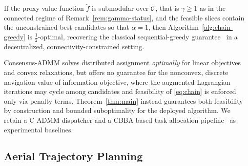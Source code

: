 \begin{corollary}
If the proxy value function $\tilde f$ is submodular over $\mathcal{C}$, that is $\gamma \geq 1$ as in the connected regime of Remark~\ref{rem:gamma-status}, and the feasible slices contain the unconstrained best candidates so that $\alpha = 1$, then Algorithm~\ref{alg:chain-greedy} is $\tfrac{1}{2}$-optimal, recovering the classical sequential-greedy guarantee~\cite{fisher1978} in a decentralized, connectivity-constrained setting.
\end{corollary}

\begin{remark}
\label{rem:admm}
Consensus-ADMM solves distributed assignment \emph{optimally} for linear objectives~\cite{shorinwa2023tro} and convex relaxations, but offers no guarantee for the nonconvex, discrete navigation-value-of-information objective, where the augmented Lagrangian iterations may cycle among candidates and feasibility of \eqref{eq:chain} is enforced only via penalty terms. Theorem~\ref{thm:main} instead guarantees both feasibility by construction and bounded suboptimality for the deployed algorithm. We retain a C-ADMM dispatcher and a CBBA-based task-allocation pipeline~\cite{choi2009consensus} as experimental baselines.
\end{remark}

\subsection{Aerial Trajectory Planning}
\label{sec:aerial-traj}

